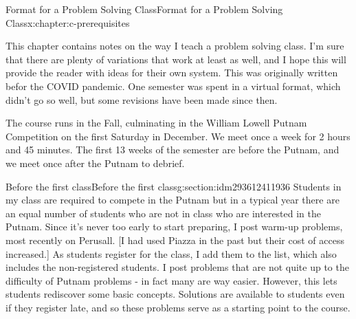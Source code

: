 \documentclass[twoside,10pt,]{book}
\numberwithin{equation}{section}
\begin{document}
\setcounter{tocdepth}{1}
\renewcommand*\contentsname{Contents}
\tableofcontents
\mainmatter
%
%
\typeout{************************************************}
\typeout{************************************************}
%
\begin{chapterptx}{Format for a Problem Solving Class}{}{Format for a Problem Solving Class}{}{}{x:chapter:c-prerequisites}
\begin{introduction}{}%
This chapter contains notes on the way I teach a problem solving class.  I'm sure that there are plenty of variations that work at least as well, and I hope this will provide the reader with ideas for their own system. This was originally written befor the COVID pandemic.  One semester was spent in a virtual format, which didn't go so well, but some revisions have been made since then.%
\par
The course runs in the Fall, culminating in the William Lowell Putnam Competition on the first Saturday in December.  We meet once a week for 2 hours and 45 minutes.  The first 13 weeks of the semester are before the Putnam, and we meet once after the Putnam to debrief.%
\end{introduction}%
%
%
\typeout{************************************************}
\typeout{************************************************}
%
\begin{sectionptx}{Before the first class}{}{Before the first class}{}{}{g:section:idm293612411936}
Students in my class are required to compete in the Putnam but in a typical year there are an equal number of students who are not in class who are interested in the Putnam.  Since it's never too early to start preparing, I post warm-up problems, most recently on Perusall. [I had used Piazza in the past but their cost of access increased.]  As students register for the class, I add them to the list, which also includes the non-registered students.  I post problems that are not quite up to the difficulty of Putnam problems - in fact many are way easier.  However, this lets students rediscover some basic concepts.  Solutions are available to students even if they register late, and so these problems serve as a starting point to the course.%
\end{sectionptx}
%
%
\typeout{************************************************}
\typeout{************************************************}

\end{chapterptx}
\end{document}
